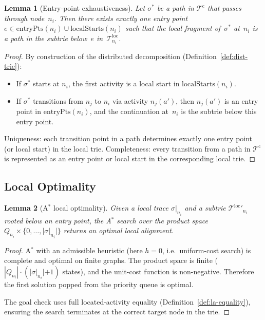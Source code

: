 \documentclass[11pt,a4paper]{article}
\newcommand{\new}[1]{{\color{Blue}#1}}         %
\newtheorem{lemma}{Lemma}
\newcommand{\T}{\mathcal{T}}
\newcommand{\Tl}{\T^{\mathrm{loc}}}
\newcommand{\Tc}{\T^{\mathrm{c}}}
\newcommand{\trace}{\sigma}
\newcommand{\na}[2]{#1(#2)}
\newcommand{\ep}{\mathrm{entryPts}}
\newcommand{\ls}{\mathrm{localStarts}}
\begin{document}
\begin{lemma}[Entry-point exhaustiveness]\label{lem:exhaustive}
  Let $\trace^{*}$ be a path in $\Tc$ that passes through node~$n_i$.
  Then there exists exactly one entry point
  $e \in \ep(n_i) \cup \ls(n_i)$ such that the local fragment
  of~$\trace^{*}$ at~$n_i$ is a path in the subtrie below~$e$
  in~$\Tl_{n_i}$.
\end{lemma}

\begin{proof}
  By construction of the distributed decomposition
  (Definition~\ref{def:dist-trie}):
  \begin{itemize}
    \item If $\trace^{*}$ starts at $n_i$, the first activity is a
          local start in $\ls(n_i)$.
    \item If $\trace^{*}$ transitions from $n_j$ to $n_i$ via activity
          $\na{n_j}{a'}$, then $\na{n_j}{a'}$ is an entry point in
          $\ep(n_i)$, and the continuation at~$n_i$ is the subtrie
          below this entry point.
  \end{itemize}
  Uniqueness: each transition point in a path determines exactly one
  entry point (or local start) in the local trie.
  Completeness: every transition from a path in $\Tc$ is represented
  as an entry point or local start in the corresponding local trie.
\end{proof}

\subsection{Local Optimality}

\begin{lemma}[A$^{*}$ local optimality]\label{lem:local-opt}
  Given a local trace $\trace|_{n_i}$ and a subtrie $\Tl'_{n_i}$
  rooted below an entry point, the A$^{*}$ search over the product
  space $Q_{n_i} \times \{0, \ldots, |\trace|_{n_i}|\}$
  returns an optimal local alignment.
\end{lemma}

\begin{proof}
  A$^{*}$ with an admissible heuristic (here $h = 0$, i.e.\ uniform-cost
  search) is complete and optimal on finite graphs.
  The product space is finite ($|Q_{n_i}| \cdot (|\trace|_{n_i}|+1)$
  states), and the unit-cost function is non-negative.
  Therefore the first solution popped from the priority queue is optimal.

  \new{The goal check uses full located-activity equality
  (Definition~\ref{def:la-equality}), ensuring the search terminates
  at the correct target node in the trie.}
\end{proof}
\end{document}
